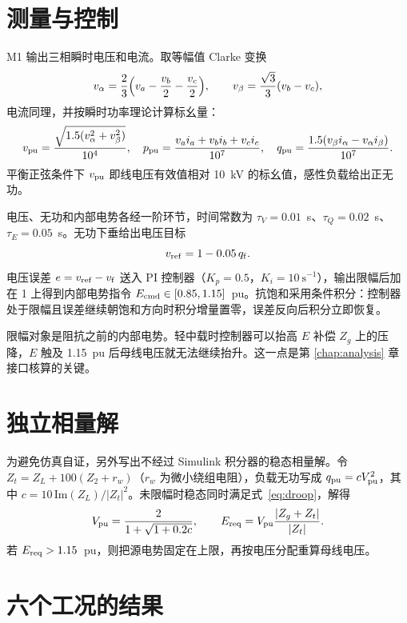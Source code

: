 \section{测量与控制}

M1 输出三相瞬时电压和电流。取等幅值 Clarke 变换
\begin{equation}
v_\alpha=\frac{2}{3}\Bigl(v_a-\frac{v_b}{2}-\frac{v_c}{2}\Bigr),\qquad
v_\beta=\frac{\sqrt3}{3}(v_b-v_c),
\end{equation}
电流同理，并按瞬时功率理论\cite{akagi2007}计算标幺量：
\begin{equation}
v_{\mathrm{pu}}=\frac{\sqrt{1.5(v_\alpha^2+v_\beta^2)}}{10^4},\quad
p_{\mathrm{pu}}=\frac{v_ai_a+v_bi_b+v_ci_c}{10^7},\quad
q_{\mathrm{pu}}=\frac{1.5(v_\beta i_\alpha-v_\alpha i_\beta)}{10^7}.
\label{eq:pq}
\end{equation}
平衡正弦条件下 $v_{\mathrm{pu}}$ 即线电压有效值相对 10~kV 的标幺值，感性负载给出正无功。

电压、无功和内部电势各经一阶环节，时间常数为 $\tau_V=0.01$~s、$\tau_Q=0.02$~s、$\tau_E=0.05$~s。无功下垂给出电压目标\cite{kundur1994}
\begin{equation}
v_{\mathrm{ref}}=1-0.05\,q_{\mathrm{f}}.
\label{eq:droop}
\end{equation}
电压误差 $e=v_{\mathrm{ref}}-v_{\mathrm{f}}$ 送入 PI 控制器（$K_p=0.5$，$K_i=10\ \mathrm{s^{-1}}$），输出限幅后加在 1 上得到内部电势指令 $E_{\mathrm{cmd}}\in[0.85,1.15]$~pu。抗饱和采用条件积分：控制器处于限幅且误差继续朝饱和方向时积分增量置零，误差反向后积分立即恢复。

限幅对象是阻抗之前的内部电势。轻中载时控制器可以抬高 $E$ 补偿 $Z_g$ 上的压降，$E$ 触及 1.15~pu 后母线电压就无法继续抬升。这一点是第 \ref{chap:analysis} 章接口核算的关键。

\section{独立相量解}

为避免仿真自证，另外写出不经过 Simulink 积分器的稳态相量解。令 $Z_t=Z_L+100(Z_2+r_w)$（$r_w$ 为微小绕组电阻），负载无功写成 $q_{\mathrm{pu}}=cV_{\mathrm{pu}}^2$，其中 $c=10\,\mathrm{Im}(Z_L)/|Z_t|^2$。未限幅时稳态同时满足式~\eqref{eq:droop}，解得
\begin{equation}
V_{\mathrm{pu}}=\frac{2}{1+\sqrt{1+0.2c}},\qquad
E_{\mathrm{req}}=V_{\mathrm{pu}}\frac{|Z_g+Z_t|}{|Z_t|}.
\label{eq:phasor}
\end{equation}
若 $E_{\mathrm{req}}>1.15$~pu，则把源电势固定在上限，再按电压分配重算母线电压。

\section{六个工况的结果}

